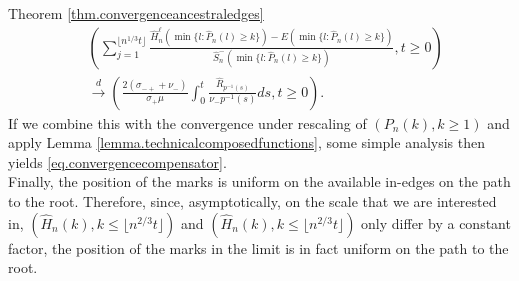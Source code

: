 \begin{proofof}{ Theorem \ref{thm.convergenceancestraledges}}
\begin{align*}&\left(\sum_{j=1}^{\lfloor n^{1/3}t\rfloor}\frac{\hat{H}^\ell_n(\min\{l:\hat{P}_n(l)\geq k\})-E(\min\{l:\hat{P}_n(l)\geq k\})}{\hat{S}^-_n(\min\{l:\hat{P}_n(l)\geq k\})},t\geq 0\right)\\
&\overset{d}{\to} \left( \frac{2(\sigma_{-+}+\nu_-)}{\sigma_+\mu} \int_0^t \frac{\hat{R}_{p^{-1}(s)}}{\nu_- p^{-1}(s)}ds,t\geq 0 \right).
\end{align*}
If we combine this with the convergence under rescaling of $(P_n(k),k\geq 1)$ and apply Lemma \ref{lemma.technicalcomposedfunctions}, some simple analysis then yields \eqref{eq.convergencecompensator}. \\
Finally, the position of the marks is uniform on the available in-edges on the path to the root. Therefore, since, asymptotically, on the scale that we are interested in, $(\hat{H}_n(k),k\leq \lfloor n^{2/3}t\rfloor)$ and $(\hat{H}_n(k),k\leq \lfloor n^{2/3}t\rfloor)$ only differ by a constant factor, the position of the marks in the limit is in fact uniform on the path to the root. 
\end{proofof}

